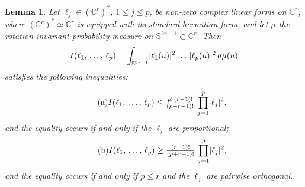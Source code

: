 \documentclass[10pt,a4paper]{article}
\DeclarePairedDelimiter{\abs}{\lvert}{\rvert}
\newenvironment{eqlist}{
\begingroup \leftskip\parindent \rightskip\parindent \noindent
\begin{minipage}{\linewidth-2\parindent}} {
\end{minipage}
\endgroup}
\newcommand*\bC{\mathbb{C}}
\newcommand*\bS{\mathbb{S}}
\let\leq\leqslant
\newtheorem{lemm}[cdrthm]{Lemma}
\numberwithin{equation}{section}
\begin{document}
\begin{lemm}\label{lemm:Chern_form_inequalities}
Let $\ell_j\in(\bC^r)^*$, $1\leq j\leq p$, be non-zero complex linear forms on $\bC^r$, where $(\bC^r)^*\simeq\bC^r$ is equipped with its standard hermitian form, and let $\mu$ the rotation invariant probability measure on $\bS^{2r-1}\subset\bC^r$. Then
\[
I(\ell_1,\,\dotsc,\,\ell_p)=\int_{\bS^{2r-1}}\abs{\ell_1(u)}^2\ldots\,\abs{\ell_p(u)}^2\, d\mu(u)
\]
satisfies the following inequalities:\\
\begin{eqlist}
\[
\tag{a}\label{item:Chern_form_inequality1}
I(\ell_1,\,\dotsc,\,\ell_p)
\le
\tfrac{p!\,(r-1)!}{ (p+r-1)!}\,\prod_{j=1}^p\abs{\ell_j}^2,
\]
and the equality occurs if and only if the $\ell_j$ are proportional;
\[
\tag{b}\label{item:Chern_form_inequality2}
I(\ell_1,\,\dotsc,\,\ell_p)
\ge
\tfrac{(r-1)!}{ (p+r-1)!}\,\prod_{j=1}^p\abs{\ell_j}^2,
\]
and the equality occurs if and only if $p\leq r$ and the $\ell_j$ are pairwise orthogonal.
\end{eqlist}
\end{lemm}
\end{document}
